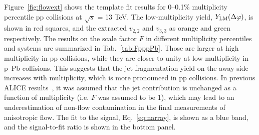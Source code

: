 Figure~\ref{fig:flowext} shows the template fit results for 0--0.1\% multiplicity percentile pp collisions at $\sqrt{s}$ = 13 TeV. The low-multiplicity yield,  $Y_{\rm{LM}}(\Delta\varphi)$, is shown in red squares, and the extracted $v_{2,2}$ and $v_{3,3}$ as orange and green respectively. The results on the scale factor $F$ in different multiplicity percentiles and systems are summarized in Tab.~\ref{tab:FpppPb}. 
Those are larger at high multiplicity in pp collisions, while they are closer to unity at low multiplicity in p--Pb collisions. This suggests that the jet fragmentation yield on the away-side increases with multiplicity, which is more pronounced in pp collisions.
 In previous ALICE results~\cite{ALICE:2012eyl,ALICE:2013snk}, it was assumed that the jet contribution is unchanged as a function of multiplicity (i.e. $F$ was assumed to be 1), which may lead to an underestimation of non-flow contamination in the final measurements of anisotropic flow. 
 The fit to the signal, Eq.~\ref{eq:narray}, is shown as a blue band, and the signal-to-fit ratio is shown in the bottom panel. 
\begin{table}[h!]
\caption{The scale factor $F$ for various multiplicity percentiles in pp (top) and p--Pb (bottom) collisions.}
\centering
{}
\label{tab:FpppPb}
\end{table}

